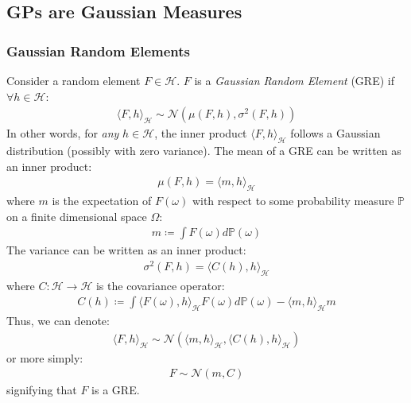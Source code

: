 \documentclass{article}
\numberwithin{equation}{section}
\begin{document}
\subsection{GPs are Gaussian Measures}
\subsubsection{Gaussian Random Elements}
 Consider a random element $F \in \mathcal{H}$. $F$ is a \textit{Gaussian Random Element} (GRE) if $\forall h \in \mathcal{H}$:
\begin{align}
    \langle F, h \rangle_\mathcal{H} \sim \mathcal{N}(\mu(F, h), \sigma^2(F, h))
\end{align}
In other words, for \textit{any} $h \in \mathcal{H}$, the inner product $\langle F, h \rangle_\mathcal{H}$ follows a Gaussian distribution (possibly with zero variance). The mean of a GRE can be written as an inner product:
\begin{align}
\mu(F, h) = \langle m, h\rangle_{\mathcal{H}}
\end{align}
where $m$ is the expectation of $F(\omega)$ with respect to some probability measure $\mathbb{P}$ on a finite dimensional space $\Omega$:
\begin{align}
    \label{gm-mean}
    m \coloneqq \int F(\omega) d \mathbb{P}(\omega)
\end{align}
The variance can be written as an inner product:
\begin{align}
\sigma^2(F, h) = \langle C(h), h\rangle_{\mathcal{H}}
\end{align}
where $C: \mathcal{H} \rightarrow \mathcal{H}$ is the covariance operator:
\begin{align}
    \label{gm-covariance}
    C(h) \coloneqq \int \langle F(\omega), h\rangle_{\mathcal{H}} F(\omega)d \mathbb{P}(\omega) - \langle m, h\rangle_{\mathcal{H}} m
\end{align}
Thus, we can denote:
\begin{align}
    \langle F, h\rangle_{\mathcal{H}} \sim \mathcal{N}\left(  \langle m, h\rangle_{\mathcal{H}},  \langle C(h), h\rangle_{\mathcal{H}}\right)
\end{align}
or more simply:
\begin{align}
    F \sim \mathcal{N}(m, C)
\end{align}
signifying that $F$ is a GRE.
\end{document}
